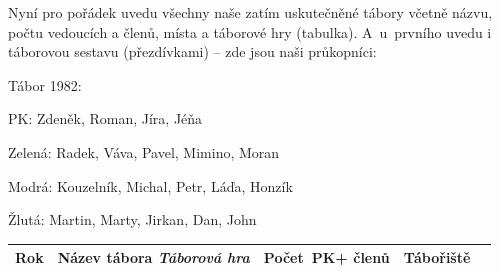 \documentclass[a5paper, 11pt, twoside]{article}
\begin{document}
Nyní pro pořádek uvedu všechny naše zatím uskutečněné tábory včetně
názvu, počtu vedoucích a členů, místa a táborové hry (tabulka).
A~u~prvního uvedu i táborovou sestavu (přezdívkami) -- zde jsou naši
průkopníci:

\bigskip
Tábor 1982:

PK: Zdeněk, Roman, Jíra, Jéňa

Zelená: Radek, Váva, Pavel, Mimino, Moran

Modrá: Kouzelník, Michal, Petr, Láďa, Honzík

Žlutá: Martin, Marty, Jirkan, Dan, John

\renewcommand{\arraystretch}{1.3}
\begin{longtable}[]{%
  >{\raggedright\arraybackslash}p{0.7cm}%
  >{\raggedright\arraybackslash}p{5.5cm}%
  >{\raggedright\arraybackslash}p{1.4cm}%
  >{\raggedright\arraybackslash}p{2cm}%
  >{\raggedright\arraybackslash}p{3cm}}

 \textbf{Rok} & \textbf{Název tábora \newline \textit{Táborová hra}}  &  \textbf{Počet~PK\newline+ členů}  &  \textbf{Tábořiště} \\

\hline \endhead


\end{longtable}
\end{document}
